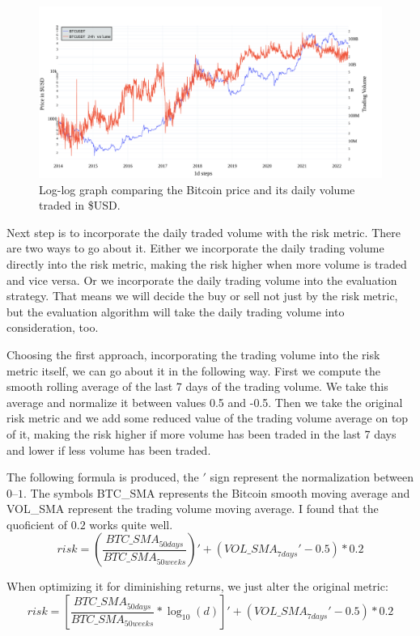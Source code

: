 \begin{figure}[!hbt]
    \centering
    \includegraphics[width=\columnwidth]{figures/24volume-log.pdf}
    \caption{Log-log graph comparing the Bitcoin price and its daily volume traded in \$USD.}
    \label{figure-24volume-log}
\end{figure}

Next step is to incorporate the daily traded volume with the risk metric. There are two ways to go about it. Either we incorporate the daily trading volume directly into the risk metric, making the risk higher when more volume is traded and vice versa. Or we incorporate the daily trading volume into the evaluation strategy. That means we will decide the buy or sell not just by the risk metric, but the evaluation algorithm will take the daily trading volume into consideration, too.

Choosing the first approach, incorporating the trading volume into the risk metric itself, we can go about it in the following way. First we compute the smooth rolling average of the last 7 days of the trading volume. We take this average and normalize it between values 0.5 and -0.5. Then we take the original risk metric and we add some reduced value of the trading volume average on top of it, making the risk higher if more volume has been traded in the last 7 days and lower if less volume has been traded.

The following formula is produced, the $'$ sign represent the normalization between $0$--$1$. The symbols BTC\_SMA represents the Bitcoin smooth moving average and VOL\_SMA represent the trading volume moving average. I found that the quoficient of $0.2$ works quite well.
$$risk = \left(\frac{\mathit{BTC\_SMA}_{50 days}}{\mathit{BTC\_SMA}_{50 weeks}}\right)' + \left(\mathit{VOL\_SMA}_{7 days}' - 0.5\right) * 0.2$$

When optimizing it for diminishing returns, we just alter the original metric:
$$risk = \left[\frac{\mathit{BTC\_SMA}_{50 days}}{\mathit{BTC\_SMA}_{50 weeks}} * \log_{10}(d)\right]' + \left(\mathit{VOL\_SMA}_{7 days}' - 0.5\right) * 0.2$$

